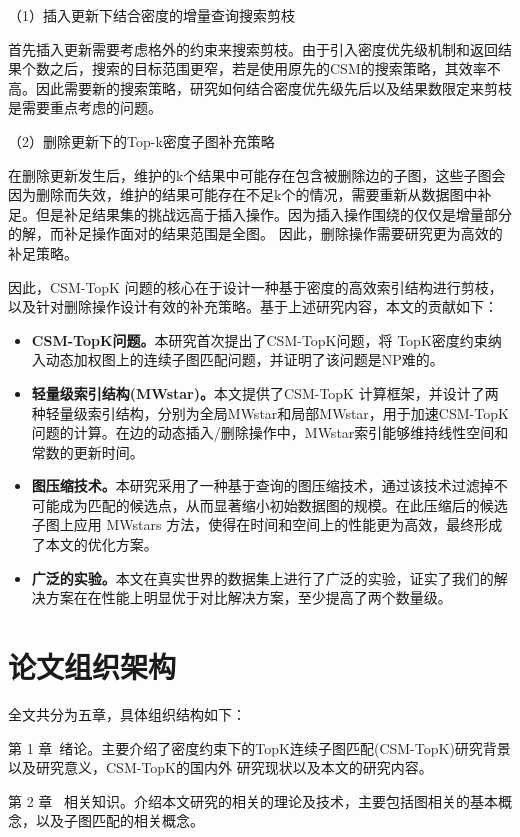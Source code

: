（1）插入更新下结合密度的增量查询搜索剪枝

      首先插入更新需要考虑格外的约束来搜索剪枝。由于引入密度优先级机制和返回结果个数之后，搜索的目标范围更窄，若是使用原先的CSM的搜索策略，其效率不高。因此需要新的搜索策略，研究如何结合密度优先级先后以及结果数限定来剪枝是需要重点考虑的问题。

（2）删除更新下的Top-k密度子图补充策略

      在删除更新发生后，维护的k个结果中可能存在包含被删除边的子图，这些子图会因为删除而失效，维护的结果可能存在不足k个的情况，需要重新从数据图中补足。但是补足结果集的挑战远高于插入操作。因为插入操作围绕的仅仅是增量部分的解，而补足操作面对的结果范围是全图。
      因此，删除操作需要研究更为高效的补足策略。

      因此，CSM-TopK 问题的核心在于设计一种基于密度的高效索引结构进行剪枝，以及针对删除操作设计有效的补充策略。基于上述研究内容，本文的贡献如下：

\begin{itemize}[label={\textbullet}]
    \item \textbf{CSM-TopK问题。}本研究首次提出了CSM-TopK问题，将 TopK密度约束纳入动态加权图上的连续子图匹配问题，并证明了该问题是NP难的。
    \item \textbf{轻量级索引结构(MWstar)。}本文提供了CSM-TopK 计算框架，并设计了两种轻量级索引结构，分别为全局MWstar和局部MWstar，用于加速CSM-TopK问题的计算。在边的动态插入/删除操作中，MWstar索引能够维持线性空间和常数的更新时间。
    \item \textbf{图压缩技术。}本研究采用了一种基于查询的图压缩技术，通过该技术过滤掉不可能成为匹配的候选点，从而显著缩小初始数据图的规模。在此压缩后的候选子图上应用 MWstars 方法，使得在时间和空间上的性能更为高效，最终形成了本文的优化方案。
    \item \textbf{广泛的实验。}本文在真实世界的数据集上进行了广泛的实验，证实了我们的解决方案在在性能上明显优于对比解决方案，至少提高了两个数量级。
  \end{itemize}
\section{论文组织架构}
全文共分为五章，具体组织结构如下：

第 1 章\ 绪论。主要介绍了密度约束下的TopK连续子图匹配(CSM-TopK)研究背景以及研究意义，CSM-TopK的国内外
研究现状以及本文的研究内容。

第 2 章 \ 相关知识。介绍本文研究的相关的理论及技术，主要包括图相关的基本概念，以及子图匹配的相关概念。

